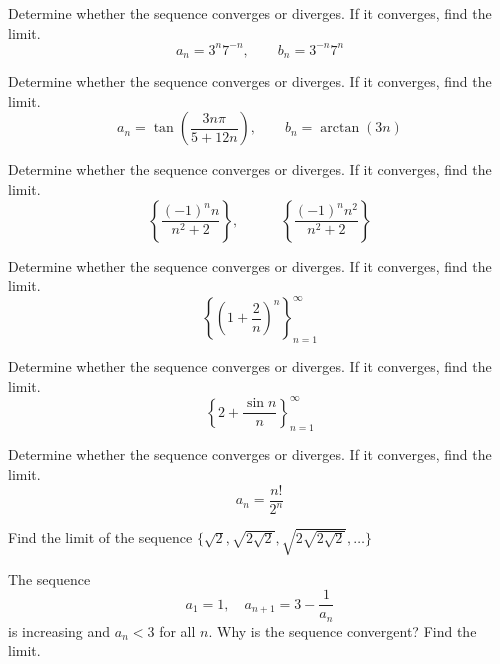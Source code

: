 \documentclass[
  course = {{MATH102 Calculus II}},
  quartile = {{2}},
  assignment = 18,%
  topic = {{11.1: Sequences}},
  firstexercise = 1,
  term = 202
]{aga-homework}
\begin{document}
\newpage


\problem Determine whether the sequence converges or diverges. If it converges, find the limit.
\[
a_n=3^n7^{-n}, \qquad b_n=3^{-n}7^{n}
\]
\newpage

\problem Determine whether the sequence converges or diverges. If it converges, find the limit.
\[
a_n=\tan\left(\frac{3n\pi}{5+12n}\right), \qquad b_n=\arctan(3n)
\]
\newpage

\problem Determine whether the sequence converges or diverges. If it converges, find the limit.
\[
\left\{\frac{(-1)^{n}n}{n^2+2}\right\}, \qquad \quad \left\{\frac{(-1)^{n}n^2}{n^2+2}\right\}
\]
\newpage

\problem Determine whether the sequence converges or diverges. If it converges, find the limit.
\[
\left\{\left(1+\frac{2}{n}\right)^n\right\}_{n=1}^{\infty}
\]
\newpage

\problem Determine whether the sequence converges or diverges. If it converges, find the limit.
\[
\left\{2+\frac{\sin n}{n}\right\}_{n=1}^{\infty}
\]
\newpage

\problem Determine whether the sequence converges or diverges. If it converges, find the limit.
\[
a_n=\frac{n!}{2^n}
\]
\newpage

\problem Find the limit of the sequence $\displaystyle \{\sqrt{2}, \sqrt{2\sqrt{2}}, \sqrt{2\sqrt{2\sqrt{2}}}, \dots\}$
\newpage


\problem The sequence 
\[a_1=1, \quad a_{n+1}=3-\frac{1}{a_n}\]
is increasing and $a_n<3$ for all $n$. Why is the sequence convergent? Find the limit.
\afterpage{\null\newpage}

\afterpage{\null\newpage}
\afterpage{\null\newpage}
\end{document}
